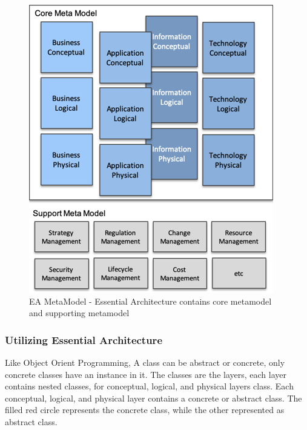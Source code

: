 \documentclass{article}
\begin{document}
\begin{figure}[ht!]
    \centering
    \includegraphics[scale=0.8]{ea-meata-model}
    \caption{EA MetaModel  - 
Essential Architecture contains core metamodel and supporting metamodel }
    \label{fig:ea-metamodel}
\end{figure}

\maketitle
\subsubsection{Utilizing Essential Architecture}

Like Object Orient Programming, A class can be abstract or concrete, only concrete classes have an instance in it. The classes are the layers, each layer contains nested classes, for conceptual, logical, and physical layers class. Each conceptual, logical, and physical layer contains a concrete or abstract class. The filled red circle represents the concrete class, while the other represented as abstract class.
\end{document}

